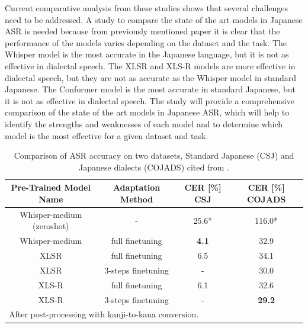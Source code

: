 Current comparative analysis from these studies shows that several challenges need to be addressed. A study to compare the state of the art models in Japanese ASR is needed because from previously mentioned paper it is clear that the performance of the models varies depending on the dataset and the task. The Whisper model is the most accurate in the Japanese language, but it is not as effective in dialectal speech. The XLSR and XLS-R models are more effective in dialectal speech, but they are not as accurate as the Whisper model in standard Japanese. The Conformer model is the most accurate in standard Japanese, but it is not as effective in dialectal speech\parencite{takahashi2024comparison}. The study will provide a comprehensive comparison of the state of the art models in Japanese ASR, which will help to identify the strengths and weaknesses of each model and to determine which model is the most effective for a given dataset and task.

\begin{table}[H]
    \centering
    \caption{Comparison of ASR accuracy on two datasets, Standard Japanese (CSJ) and Japanese dialects (COJADS) cited from \cite{takahashi2024comparison}.}
    \begin{tabular}{c|c|c|c}

    \hline
    \textbf{Pre-Trained Model Name} & \textbf{Adaptation Method} & \textbf{CER [\%] CSJ} & \textbf{CER [\%] COJADS} \\ \hline
    Whisper-medium (zeroshot)       & -                              & 25.6*                 & 116.0*                   \\ \hline
    Whisper-medium                  & full finetuning                & \textbf{4.1}          & 32.9                     \\ \hline
    XLSR                            & full finetuning                & 6.5                   & 34.1                     \\ \hline
    XLSR                            & 3-steps finetuning             & -                     & 30.0                     \\ \hline
    XLS-R                           & full finetuning                & 6.1                   & 32.6                     \\ \hline
    XLS-R                           & 3-steps finetuning             & -                     & \textbf{29.2}            \\ \hline
    \multicolumn{4}{l}{\footnotesize *After post-processing with kanji-to-kana conversion.} \\
    \end{tabular}
    \label{tab:asr_comparison}
\end{table}

